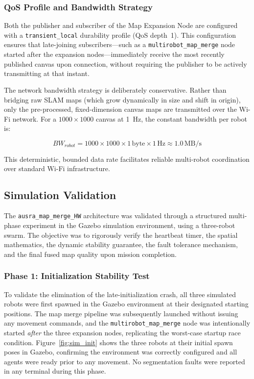 \subsubsection{QoS Profile and Bandwidth Strategy}

Both the publisher and subscriber of the Map Expansion Node are configured with a \texttt{transient\_local} durability profile (QoS depth~1). This configuration ensures that late-joining subscribers---such as a \texttt{multirobot\_map\_merge} node started after the expansion nodes---immediately receive the most recently published canvas upon connection, without requiring the publisher to be actively transmitting at that instant.

The network bandwidth strategy is deliberately conservative. Rather than bridging raw SLAM maps (which grow dynamically in size and shift in origin), only the pre-processed, fixed-dimension canvas maps are transmitted over the Wi-Fi network. For a $1000 \times 1000$ canvas at 1~Hz, the constant bandwidth per robot is:

\begin{equation}
    BW_{robot} = 1000 \times 1000 \times 1\,\text{byte} \times 1\,\text{Hz} \approx 1.0\,\text{MB/s}
    \label{eq:bandwidth}
\end{equation}

This deterministic, bounded data rate facilitates reliable multi-robot coordination over standard Wi-Fi infrastructure.

\subsection{Simulation Validation}
\label{subsec:map_merge_sim_validation}

The \texttt{ausra\_map\_merge\_HW} architecture was validated through a structured multi-phase experiment in the Gazebo simulation environment, using a three-robot swarm. The objective was to rigorously verify the heartbeat timer, the spatial mathematics, the dynamic stability guarantee, the fault tolerance mechanism, and the final fused map quality upon mission completion.

\subsubsection{Phase 1: Initialization Stability Test}

To validate the elimination of the late-initialization crash, all three simulated robots were first spawned in the Gazebo environment at their designated starting positions. The map merge pipeline was subsequently launched without issuing any movement commands, and the \texttt{multirobot\_map\_merge} node was intentionally started \emph{after} the three expansion nodes, replicating the worst-case startup race condition. Figure~\ref{fig:sim_init} shows the three robots at their initial spawn poses in Gazebo, confirming the environment was correctly configured and all agents were ready prior to any movement. No segmentation faults were reported in any terminal during this phase.

